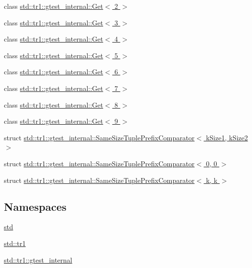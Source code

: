 \begin{DoxyCompactItemize}
\item 
class \hyperlink{classstd_1_1tr1_1_1gtest__internal_1_1_get_3_012_01_4}{std\+::tr1\+::gtest\+\_\+internal\+::\+Get$<$ 2 $>$}
\item 
class \hyperlink{classstd_1_1tr1_1_1gtest__internal_1_1_get_3_013_01_4}{std\+::tr1\+::gtest\+\_\+internal\+::\+Get$<$ 3 $>$}
\item 
class \hyperlink{classstd_1_1tr1_1_1gtest__internal_1_1_get_3_014_01_4}{std\+::tr1\+::gtest\+\_\+internal\+::\+Get$<$ 4 $>$}
\item 
class \hyperlink{classstd_1_1tr1_1_1gtest__internal_1_1_get_3_015_01_4}{std\+::tr1\+::gtest\+\_\+internal\+::\+Get$<$ 5 $>$}
\item 
class \hyperlink{classstd_1_1tr1_1_1gtest__internal_1_1_get_3_016_01_4}{std\+::tr1\+::gtest\+\_\+internal\+::\+Get$<$ 6 $>$}
\item 
class \hyperlink{classstd_1_1tr1_1_1gtest__internal_1_1_get_3_017_01_4}{std\+::tr1\+::gtest\+\_\+internal\+::\+Get$<$ 7 $>$}
\item 
class \hyperlink{classstd_1_1tr1_1_1gtest__internal_1_1_get_3_018_01_4}{std\+::tr1\+::gtest\+\_\+internal\+::\+Get$<$ 8 $>$}
\item 
class \hyperlink{classstd_1_1tr1_1_1gtest__internal_1_1_get_3_019_01_4}{std\+::tr1\+::gtest\+\_\+internal\+::\+Get$<$ 9 $>$}
\item 
struct \hyperlink{structstd_1_1tr1_1_1gtest__internal_1_1_same_size_tuple_prefix_comparator}{std\+::tr1\+::gtest\+\_\+internal\+::\+Same\+Size\+Tuple\+Prefix\+Comparator$<$ k\+Size1, k\+Size2 $>$}
\item 
struct \hyperlink{structstd_1_1tr1_1_1gtest__internal_1_1_same_size_tuple_prefix_comparator_3_010_00_010_01_4}{std\+::tr1\+::gtest\+\_\+internal\+::\+Same\+Size\+Tuple\+Prefix\+Comparator$<$ 0, 0 $>$}
\item 
struct \hyperlink{structstd_1_1tr1_1_1gtest__internal_1_1_same_size_tuple_prefix_comparator_3_01k_00_01k_01_4}{std\+::tr1\+::gtest\+\_\+internal\+::\+Same\+Size\+Tuple\+Prefix\+Comparator$<$ k, k $>$}
\end{DoxyCompactItemize}
\subsection*{Namespaces}
\begin{DoxyCompactItemize}
\item 
 \hyperlink{namespacestd}{std}
\item 
 \hyperlink{namespacestd_1_1tr1}{std\+::tr1}
\item 
 \hyperlink{namespacestd_1_1tr1_1_1gtest__internal}{std\+::tr1\+::gtest\+\_\+internal}
\end{DoxyCompactItemize}
